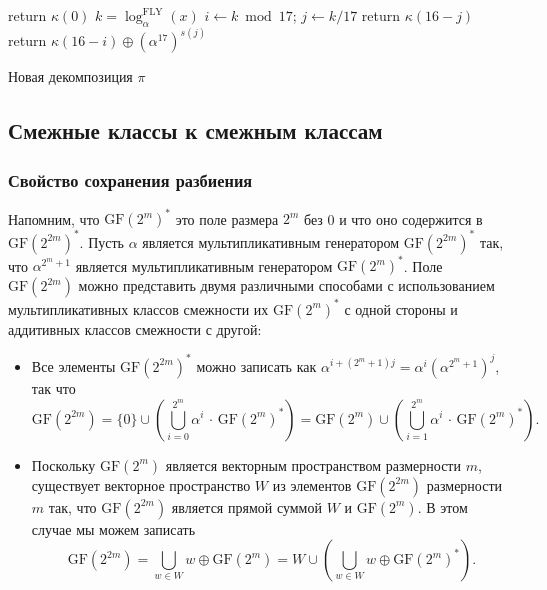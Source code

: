 \begin{algorithm}[htp!]
     {
      return $\kappa(0)$\;
    }{
      $k = \log_{\alpha}^{\text{FLY}}(x)$\;
      $i \gets k \bmod 17$; \quad $j \gets k/17 $ 
       { 
        return $\kappa(16 - j)$ 
      }{
        return $\kappa(16 - i) \oplus (\alpha^{17})^{s(j)}$ 
      }
    }
  \caption{Новая декомпозиция \(\pi\)}
  \label{alg:alg01}
\end{algorithm}

\subsection{Смежные классы к смежным классам}

\subsubsection{Свойство сохранения разбиения}

Напомним, что \(\mathrm{GF}(2^m)^*\) это поле размера \(2^m\) без 0 и что оно содержится в \(\mathrm{GF}(2^{2m})^*\).
Пусть \(\alpha\) является мультипликативным генератором \(\mathrm{GF}(2^{2m})^*\) так, что \(\alpha^{2^m+1}\) является мультипликативным генератором \(\mathrm{GF}(2^m)^*\). Поле \(\mathrm{GF}(2^{2m})\) можно представить двумя различными способами с использованием мультипликативных классов смежности их \(\mathrm{GF}(2^m)^*\) с одной стороны и аддитивных классов смежности с другой:

\begin{itemize}
  \item Все элементы \(\mathrm{GF}(2^{2m})^*\) можно записать как \(\alpha^{i+(2^m+1)j} = \alpha^i (\alpha^{2^m+1})^j\), так что
  \[
  \mathrm{GF}(2^{2m}) = \{0\} \cup \left(\bigcup_{i=0}^{2^m} \alpha^i \, \cdot \, \mathrm{GF}(2^m)^*\right) = \mathrm{GF}(2^m) \cup \left(\bigcup_{i=1}^{2^m} \alpha^i \, \cdot \, \mathrm{GF}(2^m)^*\right).
  \]
  \item Поскольку \(\mathrm{GF}(2^m)\) является векторным пространством размерности \(m\), существует векторное пространство \(W\) из элементов \(\mathrm{GF}(2^{2m})\) размерности \(m\) так, что \(\mathrm{GF}(2^{2m})\) является прямой суммой \(W\) и \(\mathrm{GF}(2^m)\). В этом случае мы можем записать
  \[
  \mathrm{GF}(2^{2m}) = \bigcup_{w \in W} w \oplus \mathrm{GF}(2^m) = W \cup \left(\bigcup_{w \in W} w \oplus \mathrm{GF}(2^m)^*\right).
  \]
\end{itemize}

